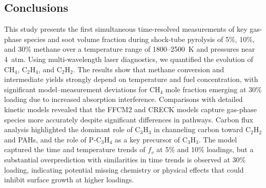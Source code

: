 \subsection{Conclusions\label{sec:conc}}
This study presents the first simultaneous time-resolved measurements of key gas-phase species and soot volume fraction during shock-tube pyrolysis of 5\%, 10\%, and 30\% methane over a temperature range of 1800–2500~K and pressures near 4~atm. Using multi-wavelength laser diagnostics, we quantified the evolution of CH$_4$, C$_2$H$_4$, and C$_2$H$_2$. The results show that methane conversion and intermediate yields strongly depend on temperature and fuel concentration, with significant model–measurement deviations for CH$_4$ mole fraction emerging at 30\% loading due to increased absorption interference. Comparisons with detailed kinetic models revealed that the FFCM2 and CRECK models capture gas-phase species more accurately despite significant differences in pathways. Carbon flux analysis highlighted the dominant role of C$_3$H$_3$ in channeling carbon toward C$_2$H$_2$ and PAHs, and the role of P-C$_3$H$_4$ as a key precursor of C$_3$H$_3$. The model captured the time and temperature trends of $f_v$ at 5\% and 10\% loadings, but a substantial overprediction with similarities in time trends is observed at 30\% loading, indicating potential missing chemistry or physical effects that could inhibit surface growth at higher loadings.